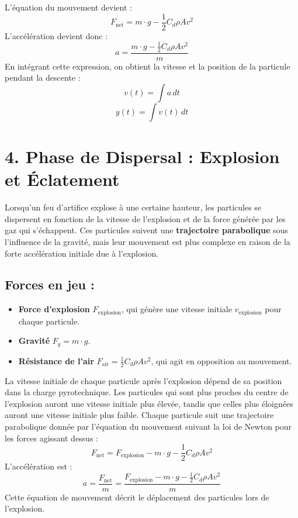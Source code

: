 \documentclass[12pt]{article}
\begin{document}
L'équation du mouvement devient :
\[
F_{\text{net}} = m \cdot g - \frac{1}{2} C_d \rho A v^2
\]
L’accélération devient donc :
\[
a = \frac{m \cdot g - \frac{1}{2} C_d \rho A v^2}{m}
\]
En intégrant cette expression, on obtient la vitesse et la position de la particule pendant la descente :
\[
v(t) = \int a \, dt
\]
\[
y(t) = \int v(t) \, dt
\]

\section*{4. Phase de Dispersal : Explosion et Éclatement}

Lorsqu'un feu d'artifice explose à une certaine hauteur, les particules se dispersent en fonction de la vitesse de l’explosion et de la force générée par les gaz qui s’échappent. Ces particules suivent une \textbf{trajectoire parabolique} sous l’influence de la gravité, mais leur mouvement est plus complexe en raison de la forte accélération initiale due à l'explosion.

\subsection*{Forces en jeu :}
\begin{itemize}
  \item \textbf{Force d'explosion} \( F_{\text{explosion}} \), qui génère une vitesse initiale \( v_{\text{explosion}} \) pour chaque particule.
  \item \textbf{Gravité} \( F_g = m \cdot g \).
  \item \textbf{Résistance de l'air} \( F_{\text{air}} = \frac{1}{2} C_d \rho A v^2 \), qui agit en opposition au mouvement.
\end{itemize}

La vitesse initiale de chaque particule après l'explosion dépend de sa position dans la charge pyrotechnique. Les particules qui sont plus proches du centre de l'explosion auront une vitesse initiale plus élevée, tandis que celles plus éloignées auront une vitesse initiale plus faible. Chaque particule suit une trajectoire parabolique donnée par l’équation du mouvement suivant la loi de Newton pour les forces agissant dessus :
\[
F_{\text{net}} = F_{\text{explosion}} - m \cdot g - \frac{1}{2} C_d \rho A v^2
\]
L'accélération est :
\[
a = \frac{F_{\text{net}}}{m} = \frac{F_{\text{explosion}} - m \cdot g - \frac{1}{2} C_d \rho A v^2}{m}
\]
Cette équation de mouvement décrit le déplacement des particules lors de l'explosion.
\end{document}
